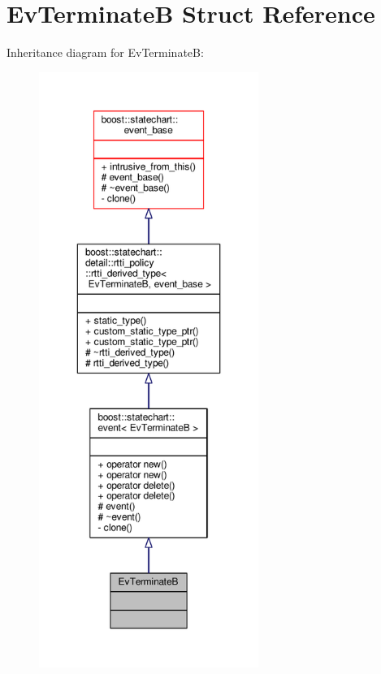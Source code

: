 \hypertarget{struct_ev_terminate_b}{}\section{Ev\+TerminateB Struct Reference}
\label{struct_ev_terminate_b}


Inheritance diagram for Ev\+TerminateB\+:
\nopagebreak
\begin{figure}[H]
\begin{center}
\leavevmode
\includegraphics[height=550pt]{struct_ev_terminate_b__inherit__graph}
\end{center}
\end{figure}


